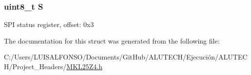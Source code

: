 \subsubsection[{S}]{\setlength{\rightskip}{0pt plus 5cm}uint8\+\_\+t S}\label{struct_s_p_i___mem_map_aef44b210af6af7cb40efdfd5469406c0}
S\+P\+I status register, offset\+: 0x3 

The documentation for this struct was generated from the following file\+:\begin{DoxyCompactItemize}
\item 
C\+:/\+Users/\+L\+U\+I\+S\+A\+L\+F\+O\+N\+S\+O/\+Documents/\+Git\+Hub/\+A\+L\+U\+T\+E\+C\+H/\+Ejecución/\+A\+L\+U\+T\+E\+C\+H/\+Project\+\_\+\+Headers/\hyperlink{_m_k_l25_z4_8h}{M\+K\+L25\+Z4.\+h}\end{DoxyCompactItemize}
